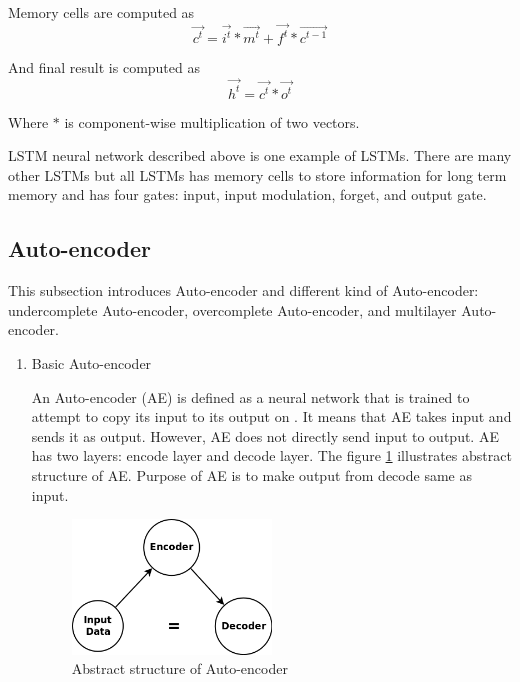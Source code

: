 \documentclass[draft,dvipsnames]{drexel-thesis}
\begin{document}
\begin{thesis}
\begin{enumerate}
\begin{enumerate}
		
		Memory cells are computed as
		$$\vec{c^t} = \vec{i^t} * \vec{m^t} + \vec{f^t} * \vec{c^{t-1}}$$
		
		And final result is computed as
		$$\vec{h^t} = \vec{c^t} * \vec{o^t}$$
		
		Where $*$ is component-wise multiplication of two vectors.
	\end{enumerate}
	
	LSTM neural network described above is one example of LSTMs. There are many other LSTMs but all LSTMs has memory cells to store information for long term memory and has four gates: input, input modulation, forget, and output gate.
\end{enumerate}


\subsection{Auto-encoder}\label{subsec:AE}

This subsection introduces Auto-encoder and different kind of Auto-encoder: undercomplete Auto-encoder, overcomplete Auto-encoder, and multilayer Auto-encoder.


\begin{enumerate}
\item Basic Auto-encoder

An Auto-encoder (AE) is defined as a neural network that is trained to attempt to copy its input to its output on \cite{Goodfellow-et-al-2016}. It means that AE takes input and sends it as output. However, AE does not directly send input to output. AE has two layers: encode layer and decode layer. The figure \ref{fig:AE} illustrates abstract structure of AE. Purpose of AE is to make output from decode same as input.

\begin{figure}[t!]
    \centering
    \includegraphics[width=0.5\textwidth]{pictures/figures/AE.png}
    \caption{Abstract structure of Auto-encoder}
    \label{fig:AE}
\end{figure}


\end{enumerate}
\end{thesis}
\end{document}
